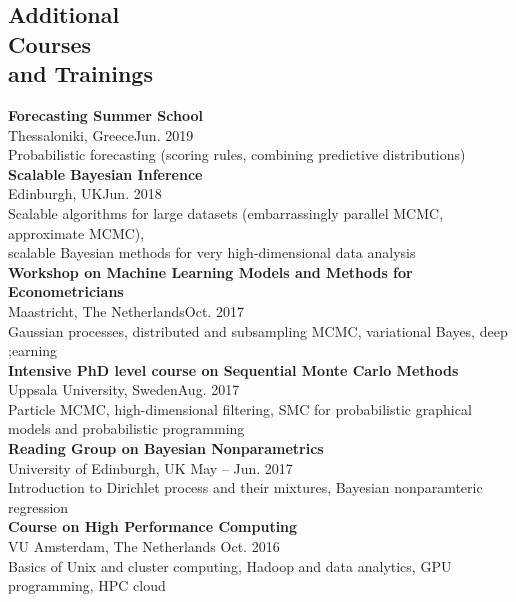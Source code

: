 \documentclass[margin,line]{resume}
\begin{document}
\begin{resume}
   \section{\mysidestyle Additional\\ Courses \\and Trainings} 
	\textbf{Forecasting Summer School}\\
        Thessaloniki, Greece\hfill Jun. 2019\\
        Probabilistic forecasting (scoring rules, combining predictive distributions)\vspace{1.5mm} \\	
	\textbf{Scalable Bayesian Inference}\\
        Edinburgh, UK\hfill Jun. 2018\\
        Scalable algorithms for large datasets (embarrassingly parallel MCMC, approximate MCMC),\\ scalable Bayesian methods for very high-dimensional data analysis\vspace{1.5mm} \\	
	\textbf{Workshop on Machine Learning Models and Methods for Econometricians}\\
        Maastricht, The Netherlands\hfill Oct. 2017\\
        Gaussian processes, distributed and subsampling MCMC, variational Bayes,  deep ;earning\vspace{1.5mm} \\	
	\textbf{Intensive PhD level course on Sequential Monte Carlo Methods}\\
        Uppsala University, Sweden\hfill Aug. 2017\\
        Particle MCMC, high-dimensional filtering, SMC for probabilistic graphical models and probabilistic programming\vspace{1.5mm} \\   
	\textbf{Reading Group on Bayesian Nonparametrics}\\
        University of Edinburgh, UK \hfill May -- Jun. 2017\\
        Introduction to Dirichlet process and their mixtures, Bayesian nonparamteric regression\vspace{1.5mm} \\
	\textbf{Course on High Performance Computing}\\
        VU Amsterdam, The Netherlands \hfill Oct. 2016\\
        Basics of Unix and cluster computing,  Hadoop and data analytics, GPU programming, HPC cloud\vspace{1.5mm} \\

\end{resume}
\end{document}
